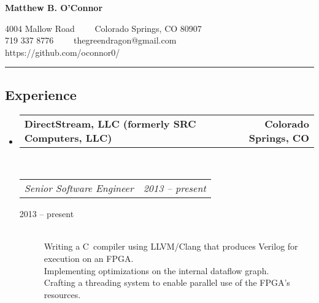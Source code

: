 \documentclass[10pt,letterpaper]{article}
\makeatletter
\newcommand{\headerrow}[2]
{\begin{tabular*}{\linewidth}{l@{\extracolsep{\fill}}r}
	#1 &
	#2 \\
\end{tabular*}}
\newcommand{\CPP}
{C\nolinebreak[4]\hspace{-.05em}\raisebox{.22ex}{\footnotesize\bf ++}}
\makeatother
\begin{document}
\begin{center}
{\LARGE \textbf{Matthew B. O'Connor}}

4004 Mallow Road\ \ \textbullet
\ \ Colorado Springs, CO 80907
\\
719 337 8776\ \ \textbullet
\ \ thegreendragon@gmail.com
\\
https://github.com/oconnor0/
\end{center}

\hrule
\vspace{-0.4em}
\subsection*{Experience}

\begin{itemize}
	\parskip=0.1em

	\item
	\headerrow
		{\textbf{DirectStream, LLC (formerly SRC Computers, LLC)}}
		{\textbf{Colorado Springs, CO}}
	\\
	\headerrow
		{\emph{Senior Software Engineer}}
		{\emph{2013 -- present}}
	\begin{description}
		\item[2013 -- present] \hfill \\
				Writing a \CPP \  compiler using LLVM/Clang that produces Verilog for execution on an FPGA. \\
				Implementing optimizations on the internal dataflow graph. \\
				Crafting a threading system to enable parallel use of the FPGA’s resources. \\
	\end{description}


\end{itemize}
\end{document}
